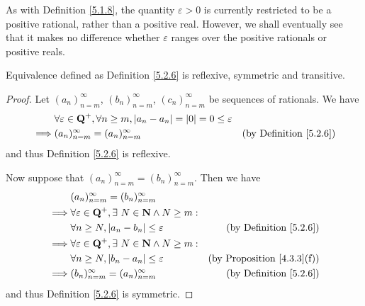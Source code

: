 \begin{remark}\label{5.2.7}
    As with Definition \ref{5.1.8}, the quantity \(\varepsilon > 0\) is currently restricted to be a positive rational, rather than a positive real.
    However, we shall eventually see that it makes no difference whether \(\varepsilon\) ranges over the positive rationals or positive reals.
\end{remark}

\begin{additional corollary}\label{ac 5.2.1}
Equivalence defined as Definition \ref{5.2.6} is reflexive, symmetric and transitive.
\end{additional corollary}

\begin{proof}
    Let \((a_n)_{n = m}^\infty\), \((b_n)_{n = m}^\infty\), \((c_n)_{n = m}^\infty\) be sequences of rationals.
    We have
    \begin{align*}
                 & \forall \varepsilon \in \mathbf{Q}^+, \forall n \geq m, \left\lvert a_n - a_n\right\rvert = \left\lvert0\right\rvert = 0 \leq \varepsilon                                      \\
        \implies & (a_n)_{n = m}^\infty = (a_n)_{n = m}^\infty                                                    & \text{(by Definition \ref{5.2.6})}
    \end{align*}
    and thus Definition \ref{5.2.6} is reflexive.

    Now suppose that \((a_n)_{n = m}^\infty = (b_n)_{n = m}^\infty\).
    Then we have
    \begin{align*}
                 & (a_n)_{n = m}^\infty = (b_n)_{n = m}^\infty                                                              \\
        \implies & \forall \varepsilon \in \mathbf{Q}^+, \exists\ N \in \mathbf{N} \land N \geq m:                                          \\
                 & \forall n \geq N, \left\lvert a_n - b_n\right\rvert \leq \varepsilon              & \text{(by Definition \ref{5.2.6})}     \\
        \implies & \forall \varepsilon \in \mathbf{Q}^+, \exists\ N \in \mathbf{N} \land N \geq m:                                          \\
                 & \forall n \geq N, \left\lvert b_n - a_n\right\rvert \leq \varepsilon              & \text{(by Proposition \ref{4.3.3}(f))} \\
        \implies & (b_n)_{n = m}^\infty = (a_n)_{n = m}^\infty                     & \text{(by Definition \ref{5.2.6})}
    \end{align*}
    and thus Definition \ref{5.2.6} is symmetric.


\end{proof}
